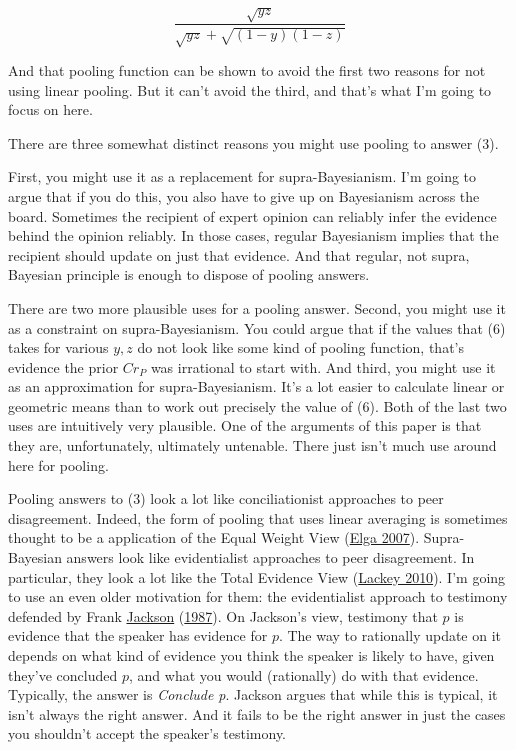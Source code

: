 \documentclass[
  12pt,
]{article}
\begin{document}
\[
\frac{\sqrt{yz}}{\sqrt{yz} + {\sqrt{(1-y)(1-z)}}}
\]

And that pooling function can be shown to avoid the first two reasons
for not using linear pooling. But it can't avoid the third, and that's
what I'm going to focus on here.

There are three somewhat distinct reasons you might use pooling to
answer (3).

First, you might use it as a replacement for supra-Bayesianism. I'm
going to argue that if you do this, you also have to give up on
Bayesianism across the board. Sometimes the recipient of expert opinion
can reliably infer the evidence behind the opinion reliably. In those
cases, regular Bayesianism implies that the recipient should update on
just that evidence. And that regular, not supra, Bayesian principle is
enough to dispose of pooling answers.

There are two more plausible uses for a pooling answer. Second, you
might use it as a constraint on supra-Bayesianism. You could argue that
if the values that (6) takes for various \(y, z\) do not look like some
kind of pooling function, that's evidence the prior \(Cr_P\) was
irrational to start with. And third, you might use it as an
approximation for supra-Bayesianism. It's a lot easier to calculate
linear or geometric means than to work out precisely the value of (6).
Both of the last two uses are intuitively very plausible. One of the
arguments of this paper is that they are, unfortunately, ultimately
untenable. There just isn't much use around here for pooling.

Pooling answers to (3) look a lot like conciliationist approaches to
peer disagreement. Indeed, the form of pooling that uses linear
averaging is sometimes thought to be a application of the Equal Weight
View (\protect\hyperlink{ref-Elga2007}{Elga 2007}). Supra-Bayesian
answers look like evidentialist approaches to peer disagreement. In
particular, they look a lot like the Total Evidence View
(\protect\hyperlink{ref-Lackey2010-LACWSW}{Lackey 2010}). I'm going to
use an even older motivation for them: the evidentialist approach to
testimony defended by Frank \protect\hyperlink{ref-Jackson1987}{Jackson}
(\protect\hyperlink{ref-Jackson1987}{1987}). On Jackson's view,
testimony that \(p\) is evidence that the speaker has evidence for
\(p\). The way to rationally update on it depends on what kind of
evidence you think the speaker is likely to have, given they've
concluded \(p\), and what you would (rationally) do with that evidence.
Typically, the answer is \emph{Conclude p}. Jackson argues that while
this is typical, it isn't always the right answer. And it fails to be
the right answer in just the cases you shouldn't accept the speaker's
testimony.
\end{document}
